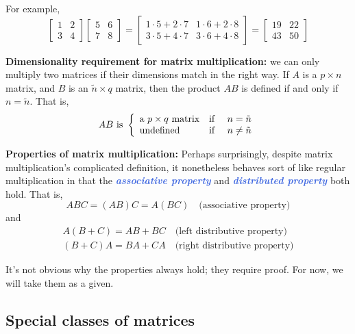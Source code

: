 \documentclass[10pt]{article}
\newcommand{\demph}[1]{\textcolor{RoyalBlue}{\textbf{\slshape #1}}} %
\theoremstyle{definition}
\newcommand{\Fl}[1]{\vspace{5mm}\noindent\textbf{#1}}%
\begin{document}
For example,
\begin{equation*}
  \begin{bmatrix}
    1&2\\
    3&4
  \end{bmatrix}
  \begin{bmatrix}
    5&6\\
    7&8
  \end{bmatrix}
  =
  \begin{bmatrix}
    1\cdot 5+2\cdot7 & 1\cdot 6 + 2\cdot8\\
    3\cdot 5+4\cdot7 & 3\cdot 6 + 4\cdot8
  \end{bmatrix}
  =
  \begin{bmatrix}
    19&22\\
    43&50
  \end{bmatrix}
\end{equation*}

\Fl{Dimensionality requirement for matrix multiplication:} we can only multiply
two matrices if their dimensions match in the right way. If $A$ is a
$p\times n$ matrix, and $B$ is an $\tilde{n} \times q$ matrix, then the
product $AB$ is defined if and only if $n=\tilde{n}$. That is,
\begin{equation*}
  AB \text{ is } \left\{ \begin{array}{l@{\quad \text{if }\quad}l} \text{a $p\times q$ matrix} & n=\tilde{n} \\
      \text{undefined}& n\neq \tilde{n} \end{array}\right.
\end{equation*}

\Fl{Properties of matrix multiplication:} Perhaps surprisingly, despite
matrix multiplication's complicated definition, it nonetheless behaves sort of
like regular multiplication in that the \demph{associative property} and
\demph{distributed property} both hold. That is,
\begin{equation*}
  ABC = (AB)C = A(BC) \quad \text{(associative property)}
\end{equation*}
and
\begin{gather*}
  A(B+C) = AB+BC \quad \text{(left distributive property)}\\
  (B+C)A = BA+CA \quad \text{(right distributive property)}
\end{gather*}

It's not obvious why the properties always hold; they require proof. For now,
we will take them as a given.


\subsection{Special classes of matrices }
\end{document}
